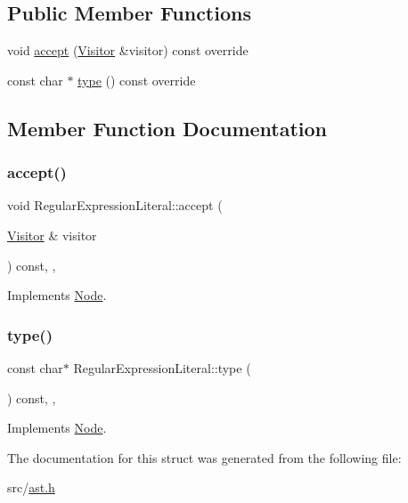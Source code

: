 \subsection*{Public Member Functions}
\begin{DoxyCompactItemize}
\item 
void \hyperlink{struct_regular_expression_literal_a0df8cb8e68e12de1751821c9a1c60617}{accept} (\hyperlink{struct_visitor}{Visitor} \&visitor) const override
\item 
const char $\ast$ \hyperlink{struct_regular_expression_literal_ae63701a6b14a5a83cde987e663acf8bd}{type} () const override
\end{DoxyCompactItemize}


\subsection{Member Function Documentation}
\mbox{\label{struct_regular_expression_literal_a0df8cb8e68e12de1751821c9a1c60617}} 
\subsubsection{\texorpdfstring{accept()}{accept()}}
{\footnotesize\ttfamily void Regular\+Expression\+Literal\+::accept (\begin{DoxyParamCaption}\item[{\hyperlink{struct_visitor}{Visitor} \&}]{visitor }\end{DoxyParamCaption}) const\hspace{0.3cm}{\ttfamily [inline]}, {\ttfamily [override]}, {\ttfamily [virtual]}}



Implements \hyperlink{struct_node_a10bd7af968140bbf5fa461298a969c71}{Node}.

\mbox{\label{struct_regular_expression_literal_ae63701a6b14a5a83cde987e663acf8bd}} 
\subsubsection{\texorpdfstring{type()}{type()}}
{\footnotesize\ttfamily const char$\ast$ Regular\+Expression\+Literal\+::type (\begin{DoxyParamCaption}{ }\end{DoxyParamCaption}) const\hspace{0.3cm}{\ttfamily [inline]}, {\ttfamily [override]}, {\ttfamily [virtual]}}



Implements \hyperlink{struct_node_a82f29420d0a38efcc370352528e94e9b}{Node}.



The documentation for this struct was generated from the following file\+:\begin{DoxyCompactItemize}
\item 
src/\hyperlink{ast_8h}{ast.\+h}\end{DoxyCompactItemize}
